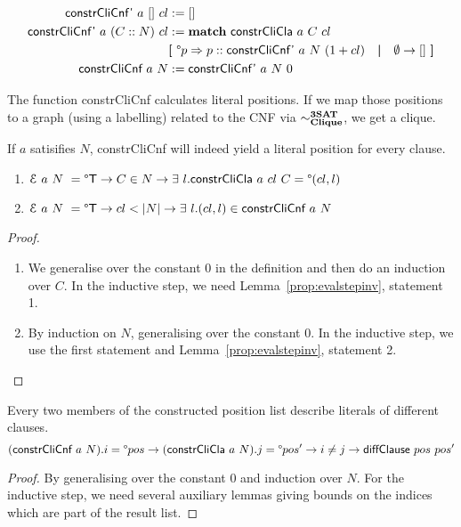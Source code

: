 \documentclass[a4paper,UKenglish,cleveref, autoref]{lipics-v2019}
\begin{document}
\begin{align*}
  \textsf{constrCliCnf'}~a~[]~cl &:= [] \\
  \textsf{constrCliCnf'}~a~(C::N)~cl &:= \textbf{match}~ \textsf{constrCliCla}~a~C~cl \\
  &\textbf{[}~ \degree p \Rightarrow p :: \textsf{constrCliCnf'}~a~N~(1 +{cl}) \quad\textbf{|}\quad \emptyset \rightarrow [] ~\textbf{]}\\
  \textsf{constrCliCnf}~a~N &:= \textsf{constrCliCnf'}~a~N~0
\end{align*}

The function \textsf{constrCliCnf} calculates literal positions. If we map those positions to a graph (using a labelling) related to the CNF via $\sim^{\textbf{3SAT}}_{\textbf{Clique}}$, we get a clique.

\begin{lemma} If $a$ satisifies $N$, \normalfont\textsf{constrCliCnf} will indeed yield a literal position for every clause. 
  \begin{enumerate}
    \item $\mathcal{E}~a~N~ = \degree\mathsf{T} \rightarrow C \in N \rightarrow \exists~l. \normalfont\textsf{constrCliCla}~a~cl~C = \degree(cl, l)$
    \item $\mathcal{E}~a~N~ = \degree\mathsf{T} \rightarrow cl < |N| \rightarrow \exists~l. (cl, l) \in \normalfont\textsf{constrCliCnf}~a~N $
  \end{enumerate}
\end{lemma}
\begin{proof}
  \begin{enumerate}
    \item We generalise over the constant 0 in the definition and then do an induction over $C$. In the inductive step, we need Lemma~\ref{prop:evalstepinv}, statement 1.
    \item By induction on $N$, generalising over the constant 0. In the inductive step, we use the first statement and Lemma~\ref{prop:evalstepinv}, statement 2. 
  \end{enumerate}
\end{proof}

\begin{lemma}
  Every two members of the constructed position list describe literals of different clauses.
  \[(\normalfont\textsf{constrCliCnf}~a~N).i = \degree pos \rightarrow (\normalfont\textsf{constrCliCla}~a~N).j = \degree pos' \rightarrow i \neq j \rightarrow \normalfont\textsf{diffClause}~pos~pos' \]
\end{lemma}
\begin{proof}
  By generalising over the constant 0 and induction over $N$. For the inductive step, we need several auxiliary lemmas giving bounds on the indices which are part of the result list.
\end{proof}
\end{document}
